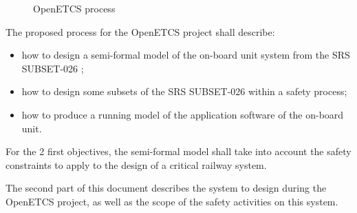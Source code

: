 \begin{figure}[h]
  \centering
  \caption{OpenETCS process}
  \label{fig:OETCSProcess}
\end{figure}


The proposed process for the OpenETCS project shall describe:
\begin{itemize}
\item how to design a semi-formal model of the on-board unit system from the SRS SUBSET-026 ;
\item how to design some subsets of the SRS SUBSET-026 within a safety process;
\item how to produce a running model of the application software of the on-board unit.
\end{itemize}

For the 2 first objectives, the semi-formal  model  shall take into account the safety constraints to apply to the design of a critical railway system.

The second part of this document describes the system to design during the OpenETCS project, as well as the scope of the safety activities on this system.


